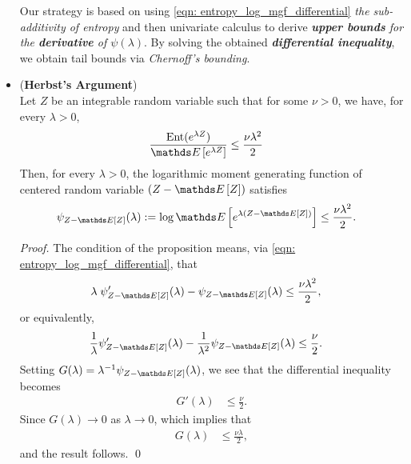\documentclass[11pt]{article}
\begin{document}
\begin{itemize}
\begin{remark}
Our strategy is based on using \eqref{eqn: entropy_log_mgf_differential} \emph{the sub-additivity of entropy} and then univariate calculus to derive \emph{\textbf{upper bounds} for the \textbf{derivative} of $\psi(\lambda)$}. By solving the obtained \emph{\textbf{differential inequality}}, we obtain tail bounds via \emph{Chernoff's bounding}.
\end{remark}

\item \begin{proposition} (\textbf{Herbst's Argument}) \citep{boucheron2013concentration, wainwright2019high}\\
Let $Z$ be an integrable random variable such that for some $\nu > 0$, we have, for every $\lambda > 0$,
\begin{align}
\frac{\text{Ent}(e^{\lambda Z})}{\E{}{e^{\lambda Z}}} &\le \frac{\nu \lambda^2}{2} \label{ineqn: herbst_argument}
\end{align} Then, for every $\lambda >0$, the logarithmic moment generating function of centered random variable $(Z - \E{}{Z})$ satisfies
\begin{align*}
\psi_{Z - \E{}{Z}}(\lambda) := \log\E{}{e^{\lambda (Z - \E{}{Z})}} &\le \frac{\nu \lambda^2}{2} .
\end{align*}
\end{proposition}
\begin{proof}
The condition of the proposition means, via \eqref{eqn: entropy_log_mgf_differential}, that
\begin{align*}
\lambda\; \psi_{Z - \E{}{Z}}'(\lambda) - \psi_{Z - \E{}{Z}}(\lambda) &\le \frac{\nu \lambda^2}{2},
\end{align*} or equivalently,
\begin{align*}
\frac{1}{\lambda}\psi_{Z - \E{}{Z}}'(\lambda) - \frac{1}{\lambda^2}\psi_{Z - \E{}{Z}}(\lambda) &\le \frac{\nu}{2}.
\end{align*} Setting $G(\lambda) = \lambda^{-1}\psi_{Z - \E{}{Z}}(\lambda)$, we see that the differential inequality becomes
\begin{align*}
G'(\lambda) &\le \frac{\nu}{2}.
\end{align*} Since $G(\lambda) \to 0$ as $\lambda \to 0$, which implies that
\begin{align*}
G(\lambda) &\le \frac{\nu \lambda}{2},
\end{align*} and the result follows. \qed
\end{proof}

\end{itemize}
\end{document}
